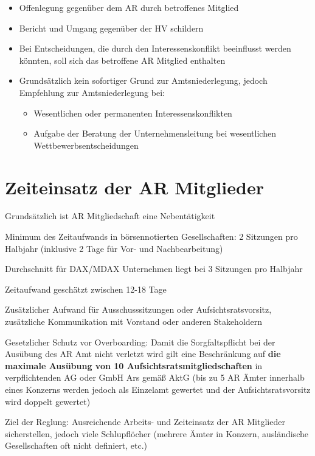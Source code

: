 \documentclass[
]{article}
\providecommand{\tightlist}{%
  \setlength{\itemsep}{0pt}\setlength{\parskip}{0pt}}
\begin{document}
\begin{itemize}
\item
  Offenlegung gegenüber dem AR durch betroffenes Mitglied
\item
  Bericht und Umgang gegenüber der HV schildern
\item
  Bei Entscheidungen, die durch den Interessenskonflikt beeinflusst
  werden könnten, soll sich das betroffene AR Mitglied enthalten
\item
  Grundsätzlich kein sofortiger Grund zur Amtsniederlegung, jedoch
  Empfehlung zur Amtsniederlegung bei:

  \begin{itemize}
  \tightlist
  \item
    Wesentlichen oder permanenten Interessenskonflikten
  \item
    Aufgabe der Beratung der Unternehmensleitung bei wesentlichen
    Wettbewerbsentscheidungen
  \end{itemize}
\end{itemize}

\hypertarget{zeiteinsatz-der-ar-mitglieder}{%
\section{Zeiteinsatz der AR
Mitglieder}\label{zeiteinsatz-der-ar-mitglieder}}

Grundsätzlich ist AR Mitgliedschaft eine Nebentätigkeit

Minimum des Zeitaufwands in börsennotierten Gesellschaften: 2 Sitzungen
pro Halbjahr (inklusive 2 Tage für Vor- und Nachbearbeitung)

Durchschnitt für DAX/MDAX Unternehmen liegt bei 3 Sitzungen pro Halbjahr

Zeitaufwand geschätzt zwischen 12-18 Tage

Zusätzlicher Aufwand für Ausschusssitzungen oder Aufsichtsratsvorsitz,
zusätzliche Kommunikation mit Vorstand oder anderen Stakeholdern

Gesetzlicher Schutz vor Overboarding: Damit die Sorgfaltspflicht bei der
Ausübung des AR Amt nicht verletzt wird gilt eine Beschränkung auf
\textbf{die maximale Ausübung von 10 Aufsichtsratsmitgliedschaften} in
verpflichtenden AG oder GmbH Ars gemäß AktG (bis zu 5 AR Ämter innerhalb
eines Konzerns werden jedoch als Einzelamt gewertet und der
Aufsichtsratsvorsitz wird doppelt gewertet)

Ziel der Reglung: Ausreichende Arbeits- und Zeiteinsatz der AR
Mitglieder sicherstellen, jedoch viele Schlupflöcher (mehrere Ämter in
Konzern, ausländische Gesellschaften oft nicht definiert, etc.)
\end{document}
